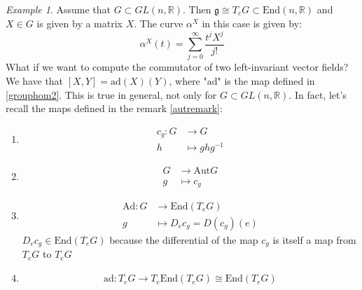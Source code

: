 \documentclass[a4paper,11pt,titlepage, article, oneside]{memoir}
\numberwithin{equation}{section}
\theoremstyle{definition}
\theoremstyle{remark}
\newtheorem{example}[theorem]{Example}
\newcommand{\rfield}{\mathbb{R}}
\newcommand{\lie}[1]{\mathfrak{#1}}
\begin{document}
\begin{tcolorbox}
\begin{example}
Assume that  $G \subset GL(n, \rfield)$. Then $\lie{g} \cong T_e G \subset \text{End}(n, \rfield)$ and $X \in G$ is given by a matrix $X$. The curve $\alpha^X$ in this case is given by:
\begin{equation} \label{expmatrix}
\alpha^X(t) = \sum\limits_{j=0}^{\infty} \frac{t^j X^j}{j!}
\end{equation}
What if we want to compute the commutator of two left-invariant vector fields? We have that $[X, Y] = \text{ad}(X)(Y)$, where "$\text{ad}$" is the map defined in \eqref{grouphom2}. This is true in general, not only for $G \subset GL(n, \rfield)$. In fact, let's recall the maps defined in the remark \ref{autremark}:
\begin{enumerate}
\item \begin{align}
c_g \colon G &\rightarrow G \\
h &\mapsto ghg^{-1} \nonumber
\end{align}
\item \begin{align}
G &\rightarrow \text{Aut}G \\
g &\mapsto c_g \nonumber
\end{align}
\item \begin{align}
\text{Ad} \colon G &\rightarrow \text{End}(T_e G) \\
g &\mapsto D_e c_g = D(c_g)(e) \nonumber
\end{align}
$D_e c_g \in \text{End}(T_e G)$ because the differential of the map $c_g$ is itself a map from $T_e G$ to $T_e G$
\item \begin{equation}
\text{ad} \colon T_e G \rightarrow T_e \text{End}(T_e G) \cong \text{End}(T_e G)
\end{equation}




\end{enumerate}
\end{example}
\end{tcolorbox}
\end{document}
